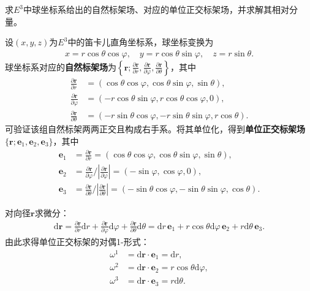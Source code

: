 \documentclass[../../main.tex]{subfiles}%
\begin{document}
\begin{example}
求$E^3$中球坐标系给出的自然标架场、对应的单位正交标架场，并求解其相对分量。
\end{example}
\begin{solution}
设$(x,y,z)$为$E^3$中的笛卡儿直角坐标系，球坐标变换为
\begin{align*}
x = r\cos\theta\cos\varphi,\quad y = r\cos\theta\sin\varphi,\quad z = r\sin\theta.
\end{align*}
球坐标系对应的\textbf{自然标架场}为$\left\{\bm{r};\frac{\partial \bm{r}}{\partial r},\frac{\partial \bm{r}}{\partial \varphi},\frac{\partial \bm{r}}{\partial \theta}\right\}$，其中
\begin{align}
\frac{\partial \bm{r}}{\partial r} &= (\cos\theta\cos\varphi,\cos\theta\sin\varphi,\sin\theta), \nonumber \\
\frac{\partial \bm{r}}{\partial \varphi} &= (-r\cos\theta\sin\varphi,r\cos\theta\cos\varphi,0), \nonumber \\
\frac{\partial \bm{r}}{\partial \theta} &= (-r\sin\theta\cos\varphi,-r\sin\theta\sin\varphi,r\cos\theta). \label{eq:natural-frame-sphere}
\end{align}
可验证该组自然标架两两正交且构成右手系。将其单位化，得到\textbf{单位正交标架场}$\{\bm{r}; \boldsymbol{e}_1,\boldsymbol{e}_2,\boldsymbol{e}_3\}$，其中
\begin{align}
\boldsymbol{e}_1 &= \frac{\partial \bm{r}}{\partial r} = (\cos\theta\cos\varphi,\cos\theta\sin\varphi,\sin\theta), \nonumber \\
\boldsymbol{e}_2 &= \frac{\partial \bm{r}}{\partial \varphi}\bigg/\left|\frac{\partial \bm{r}}{\partial \varphi}\right| = (-\sin\varphi,\cos\varphi,0), \nonumber \\
\boldsymbol{e}_3 &= \frac{\partial \bm{r}}{\partial \theta}\bigg/\left|\frac{\partial \bm{r}}{\partial \theta}\right| = (-\sin\theta\cos\varphi,-\sin\theta\sin\varphi,\cos\theta). \label{eq:ortho-frame-sphere}
\end{align}

对向径$\bm{r}$求微分：
\begin{align}
\mathrm{d}\bm{r} = \frac{\partial \bm{r}}{\partial r}\mathrm{d}r + \frac{\partial \bm{r}}{\partial \varphi}\mathrm{d}\varphi + \frac{\partial \bm{r}}{\partial \theta}\mathrm{d}\theta = \mathrm{d}r\,\boldsymbol{e}_1 + r\cos\theta\mathrm{d}\varphi\,\boldsymbol{e}_2 + r\mathrm{d}\theta\,\boldsymbol{e}_3. \label{eq:dr-sphere}
\end{align}
由此求得单位正交标架的对偶1-形式：
\begin{align}
\omega^1 &= \mathrm{d}\bm{r}\cdot\boldsymbol{e}_1 = \mathrm{d}r, \nonumber \\
\omega^2 &= \mathrm{d}\bm{r}\cdot\boldsymbol{e}_2 = r\cos\theta\mathrm{d}\varphi, \nonumber \\
\omega^3 &= \mathrm{d}\bm{r}\cdot\boldsymbol{e}_3 = r\mathrm{d}\theta. \label{eq:dual-form-sphere}
\end{align}


\end{solution}
\end{document}
